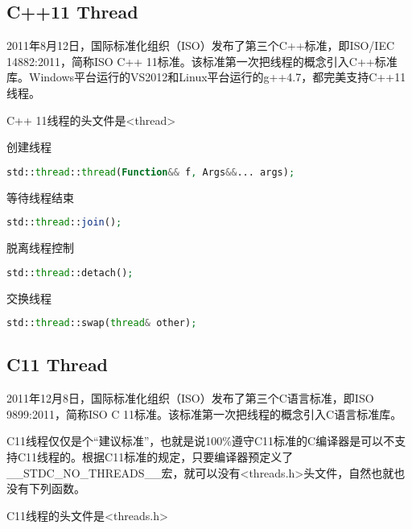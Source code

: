 \subsection{C++11 Thread}

2011年8月12日，国际标准化组织（ISO）发布了第三个C++标准，即ISO/IEC 14882:2011，简称ISO C++ 11标准。该标准第一次把线程的概念引入C++标准库。Windows平台运行的VS2012和Linux平台运行的g++4.7，都完美支持C++11线程。

C++ 11线程的头文件是<thread>

\begin{compactitem}
\item 创建线程

\begin{lstlisting}[language=PHP]
std::thread::thread(Function&& f, Args&&... args);
\end{lstlisting}

\item 等待线程结束

\begin{lstlisting}[language=PHP]
std::thread::join();
\end{lstlisting}

\item 脱离线程控制

\begin{lstlisting}[language=PHP]
std::thread::detach();
\end{lstlisting}


\item 交换线程

\begin{lstlisting}[language=PHP]
std::thread::swap(thread& other);
\end{lstlisting}
\end{compactitem}


\subsection{C11 Thread}


2011年12月8日，国际标准化组织（ISO）发布了第三个C语言标准，即ISO 9899:2011，简称ISO C 11标准。该标准第一次把线程的概念引入C语言标准库。

C11线程仅仅是个“建议标准”，也就是说100\%遵守C11标准的C编译器是可以不支持C11线程的。根据C11标准的规定，只要编译器预定义了\_\_STDC\_NO\_THREADS\_\_宏，就可以没有<threads.h>头文件，自然也就也没有下列函数。

C11线程的头文件是<threads.h>

